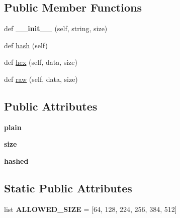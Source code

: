 \subsection*{Public Member Functions}
\begin{DoxyCompactItemize}
\item 
def {\bfseries \+\_\+\+\_\+init\+\_\+\+\_\+} (self, string, size)\hypertarget{classhal_1_1maths_1_1crypt_1_1_m_d6_a44aaff6ac5a1369c30c6515e36f3e4f2}{}\label{classhal_1_1maths_1_1crypt_1_1_m_d6_a44aaff6ac5a1369c30c6515e36f3e4f2}

\item 
def \hyperlink{classhal_1_1maths_1_1crypt_1_1_m_d6_ad3e597a2acb6d2e2ff3dbccdde536ab1}{hash} (self)
\item 
def \hyperlink{classhal_1_1maths_1_1crypt_1_1_m_d6_abe7af5abf04e41a31b3c901124aa1114}{hex} (self, data, size)
\item 
def \hyperlink{classhal_1_1maths_1_1crypt_1_1_m_d6_a325f687cdf1081ae62d54638a5774293}{raw} (self, data, size)
\end{DoxyCompactItemize}
\subsection*{Public Attributes}
\begin{DoxyCompactItemize}
\item 
{\bfseries plain}\hypertarget{classhal_1_1maths_1_1crypt_1_1_m_d6_a278814da97344037e49882218a3e5f99}{}\label{classhal_1_1maths_1_1crypt_1_1_m_d6_a278814da97344037e49882218a3e5f99}

\item 
{\bfseries size}\hypertarget{classhal_1_1maths_1_1crypt_1_1_m_d6_ac536bb3b4e1a4099845865e51e31291f}{}\label{classhal_1_1maths_1_1crypt_1_1_m_d6_ac536bb3b4e1a4099845865e51e31291f}

\item 
{\bfseries hashed}\hypertarget{classhal_1_1maths_1_1crypt_1_1_m_d6_a4f2445ec801202f1eefed4c428778ea8}{}\label{classhal_1_1maths_1_1crypt_1_1_m_d6_a4f2445ec801202f1eefed4c428778ea8}

\end{DoxyCompactItemize}
\subsection*{Static Public Attributes}
\begin{DoxyCompactItemize}
\item 
list {\bfseries A\+L\+L\+O\+W\+E\+D\+\_\+\+S\+I\+ZE} = \mbox{[}64, 128, 224, 256, 384, 512\mbox{]}\hypertarget{classhal_1_1maths_1_1crypt_1_1_m_d6_a54b930b58adc82ff6fb00b7ec03b9194}{}\label{classhal_1_1maths_1_1crypt_1_1_m_d6_a54b930b58adc82ff6fb00b7ec03b9194}

\end{DoxyCompactItemize}


